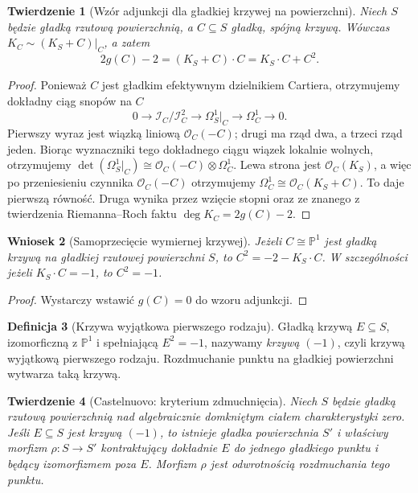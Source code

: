 \documentclass[11pt,a4paper,openany]{report}
\numberwithin{equation}{section}
\theoremstyle{plain}
\newtheorem{twierdzenie}{Twierdzenie}[section]
\newtheorem{wniosek}[twierdzenie]{Wniosek}
\theoremstyle{definition}
\newtheorem{definicja}[twierdzenie]{Definicja}
\theoremstyle{remark}
\newcommand{\PP}{\mathbb P}
\begin{document}
\begin{twierdzenie}[Wzór adjunkcji dla gładkiej krzywej na powierzchni]
\label{tw:ga6-adjunction}
Niech $S$ będzie gładką rzutową powierzchnią, a
$C\subseteq S$ gładką, spójną krzywą. Wówczas
$K_C\sim (K_S+C)|_C$, a zatem
\[
 2g(C)-2=(K_S+C)\cdot C=K_S\cdot C+C^2.
\]
\end{twierdzenie}
\begin{proof}
Ponieważ $C$ jest gładkim efektywnym dzielnikiem
Cartiera, otrzymujemy dokładny ciąg snopów na $C$
\[
0\longrightarrow\mathcal I_C/\mathcal I_C^2
 \longrightarrow\Omega^1_S|_C\longrightarrow\Omega^1_C
 \longrightarrow0.
\]
Pierwszy wyraz jest wiązką liniową
$\mathcal O_C(-C)$; drugi ma rząd dwa, a trzeci
rząd jeden. Biorąc wyznaczniki tego dokładnego
ciągu wiązek lokalnie wolnych, otrzymujemy
$\det(\Omega^1_S|_C)\cong
 \mathcal O_C(-C)\otimes\Omega^1_C$.
Lewa strona jest $\mathcal O_C(K_S)$,
a więc po przeniesieniu czynnika
$\mathcal O_C(-C)$ otrzymujemy
$\Omega_C^1\cong\mathcal O_C(K_S+C)$.
To daje pierwszą równość. Druga wynika przez
wzięcie stopni oraz ze znanego z twierdzenia
Riemanna--Roch faktu $\deg K_C=2g(C)-2$.
\end{proof}

\begin{wniosek}[Samoprzecięcie wymiernej krzywej]
\label{wn:ga6-rational-adjunction}
Jeżeli $C\cong\PP^1$ jest gładką krzywą na gładkiej
rzutowej powierzchni $S$, to
$C^2=-2-K_S\cdot C$.
W szczególności jeżeli $K_S\cdot C=-1$, to $C^2=-1$.
\end{wniosek}
\begin{proof}
Wystarczy wstawić $g(C)=0$ do wzoru adjunkcji.
\end{proof}

\begin{definicja}[Krzywa wyjątkowa pierwszego rodzaju]
Gładką krzywą $E\subseteq S$, izomorficzną z
$\PP^1$ i spełniającą $E^2=-1$, nazywamy
\emph{krzywą $(-1)$}, czyli krzywą wyjątkową
pierwszego rodzaju. Rozdmuchanie punktu na gładkiej
powierzchni wytwarza taką krzywą.
\end{definicja}

\begin{twierdzenie}[Castelnuovo: kryterium zdmuchnięcia]
\label{tw:ga6-castelnuovo}
Niech $S$ będzie gładką rzutową powierzchnią nad
algebraicznie domkniętym ciałem charakterystyki zero.
Jeśli $E\subseteq S$ jest krzywą $(-1)$, to istnieje
gładka powierzchnia $S'$ i właściwy morfizm
$\rho:S\to S'$ kontraktujący dokładnie $E$ do jednego
gładkiego punktu i będący izomorfizmem poza $E$.
Morfizm $\rho$ jest odwrotnością rozdmuchania tego punktu.
\end{twierdzenie}
\end{document}
